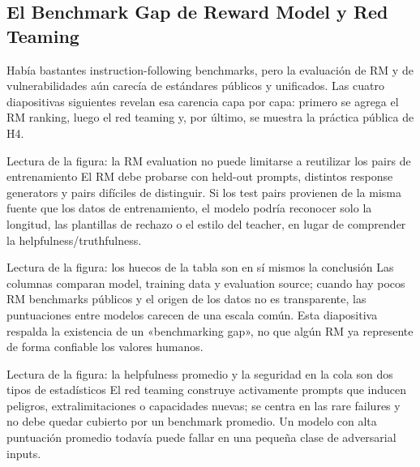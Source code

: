 \subsection{El Benchmark Gap de Reward Model y Red Teaming}

Había bastantes instruction-following benchmarks, pero la evaluación de RM y de vulnerabilidades aún carecía de estándares públicos y unificados. Las cuatro diapositivas siguientes revelan esa carencia capa por capa: primero se agrega el RM ranking, luego el red teaming y, por último, se muestra la práctica pública de H4.


\begin{knowledgebox}{Lectura de la figura: la RM evaluation no puede limitarse a reutilizar los pairs de entrenamiento}
El RM debe probarse con held-out prompts, distintos response generators y pairs difíciles de distinguir. Si los test pairs provienen de la misma fuente que los datos de entrenamiento, el modelo podría reconocer solo la longitud, las plantillas de rechazo o el estilo del teacher, en lugar de comprender la helpfulness/truthfulness.
\end{knowledgebox}


\begin{knowledgebox}{Lectura de la figura: los huecos de la tabla son en sí mismos la conclusión}
Las columnas comparan model, training data y evaluation source; cuando hay pocos RM benchmarks públicos y el origen de los datos no es transparente, las puntuaciones entre modelos carecen de una escala común. Esta diapositiva respalda la existencia de un «benchmarking gap», no que algún RM ya represente de forma confiable los valores humanos.
\end{knowledgebox}


\begin{knowledgebox}{Lectura de la figura: la helpfulness promedio y la seguridad en la cola son dos tipos de estadísticos}
El red teaming construye activamente prompts que inducen peligros, extralimitaciones o capacidades nuevas; se centra en las rare failures y no debe quedar cubierto por un benchmark promedio. Un modelo con alta puntuación promedio todavía puede fallar en una pequeña clase de adversarial inputs.
\end{knowledgebox}

